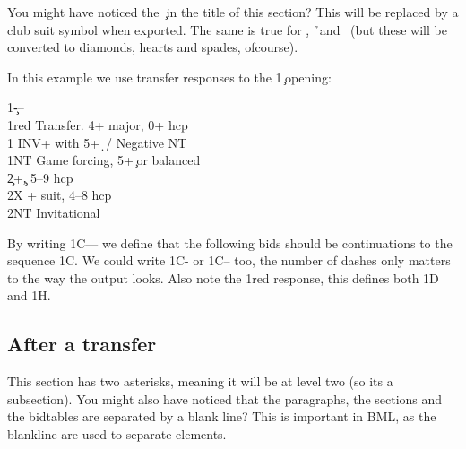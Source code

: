 \documentclass[a4paper]{article}
\begin{document}
You might have noticed the \c\ in the title of this section? This
will be replaced by a club suit symbol when exported. The same is
true for \d, \h\ and \s\ (but these will be converted to diamonds,
hearts and spades, ofcourse).

In this example we use transfer responses to the 1\c\ opening:

\begin{bidtable}
1\c---\\
1red \> Transfer. 4+ major, 0+ hcp\\
1\s \> INV+ with 5+\d\ / Negative NT\\
1NT \> Game forcing, 5+\c\ or balanced\\
2\c {}+\c, 5--9 hcp\\
2X + suit, 4--8 hcp\\
2NT \> Invitational
\end{bidtable}

By writing 1C--- we define that the following bids should be
continuations to the sequence 1C. We could write 1C- or 1C-- too,
the number of dashes only matters to the way the output looks. Also
note the 1red response, this defines both 1D and 1H.

\subsection{After a transfer}

This section has two asterisks, meaning it will be at level two
(so its a subsection). You might also have noticed that the
paragraphs, the sections and the bidtables are separated by a
blank line? This is important in BML, as the blankline are used to
separate elements.
\end{document}
